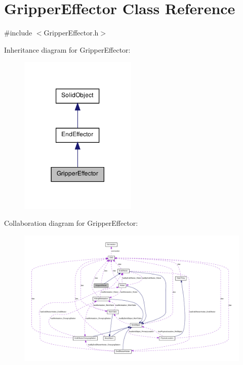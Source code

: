 \hypertarget{class_gripper_effector}{
\section{GripperEffector Class Reference}
\label{class_gripper_effector}
}


{\ttfamily \#include $<$GripperEffector.h$>$}



Inheritance diagram for GripperEffector:\nopagebreak
\begin{figure}[H]
\begin{center}
\leavevmode
\includegraphics[width=158pt]{class_gripper_effector__inherit__graph}
\end{center}
\end{figure}


Collaboration diagram for GripperEffector:\nopagebreak
\begin{figure}[H]
\begin{center}
\leavevmode
\includegraphics[width=400pt]{class_gripper_effector__coll__graph}
\end{center}
\end{figure}
